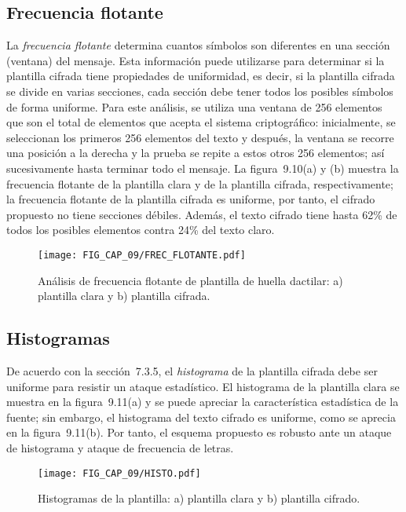 \subsection{Frecuencia flotante}
La \textit{frecuencia flotante} determina cuantos símbolos son diferentes en una sección (ventana) del mensaje. Esta información puede utilizarse para determinar si la plantilla cifrada tiene propiedades de uniformidad, es decir, si la plantilla cifrada se divide en varias secciones, cada sección debe tener todos los posibles símbolos de forma uniforme. Para este análisis, se utiliza una ventana de 256 elementos que son el total de elementos que acepta el sistema criptográfico: inicialmente, se seleccionan los primeros 256 elementos del texto y después, la ventana se recorre una posición a la derecha y la prueba se repite a estos otros 256 elementos; así sucesivamente hasta terminar todo el mensaje. La figura~9.10(a) y (b) muestra la frecuencia flotante de la plantilla clara y de la plantilla cifrada, respectivamente; la frecuencia flotante de la plantilla cifrada es uniforme, por tanto, el cifrado propuesto no tiene secciones débiles. Además, el texto cifrado tiene hasta 62\% de todos los posibles elementos contra 24\% del texto claro. 

\begin{figure}[!htbp] %
	\center
	\texttt{[image: FIG\_CAP\_09/FREC\_FLOTANTE.pdf]}  
	\caption{Análisis de frecuencia flotante de plantilla de huella dactilar: a) plantilla clara y b) plantilla cifrada.}
\end{figure}

\subsection{Histogramas}
De acuerdo con la sección~7.3.5, el \textit{histograma} de la plantilla cifrada debe ser uniforme para resistir un ataque estadístico. El histograma de la plantilla clara se muestra en la figura~9.11(a) y se puede apreciar la característica estadística de la fuente; sin embargo, el histograma del texto cifrado es uniforme, como se aprecia en la figura~9.11(b). Por tanto, el esquema propuesto es robusto ante un ataque de histograma y ataque de frecuencia de letras.  
  
\begin{figure}[!htbp] %
	\center
	\texttt{[image: FIG\_CAP\_09/HISTO.pdf]}    
	\caption{Histogramas de la plantilla: a) plantilla clara y b) plantilla cifrado.}
\end{figure}

